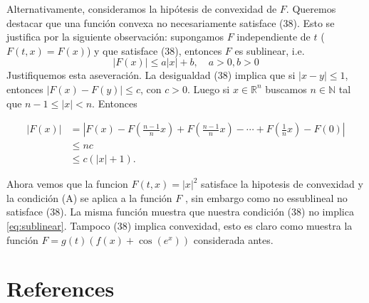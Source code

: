 \documentclass[twoside]{elsarticle}
\theoremstyle{remark}
\newcommand{\rr}{\mathbb{R}}
\newcommand{\nn}{\mathbb{N}}
\renewcommand{\leq}{\leqslant}
\begin{document}
Alternativamente, consideramos la hipótesis de convexidad de $F$. Queremos destacar que una función convexa no necesariamente satisface (38). Esto se justifica por la siguiente observación: supongamos $F$ independiente de $t$ ($F(t,x)=F(x)$) y que satisface (38), entonces $F$ es sublinear, i.e.
\[|F(x)|\leq a|x|+b,\quad a>0,b>0\]
Justifiquemos esta aseveración. La desigualdad (38) implica que si $|x-y|\leq 1$, entonces $|F(x)-F(y)|\leq c$, con $c>0$. Luego si $x\in\rr^n$ buscamos $n\in\nn$ tal que $n-1\leq |x|<n$. Entonces

\[
\begin{split}
|F(x)|&=\left|F(x)-F\left(\frac{n-1}{n}x\right)+ F\left(\frac{n-1}{n}x\right)-  \cdots
+F\left(\frac{1}{n}x\right)-F(0)\right|\\
&\leq nc\\
&\leq c(|x|+1).
\end{split}
\]

Ahora vemos que la funcion $F(t,x)=|x|^2$ satisface la hipotesis de convexidad y la condición (A) se aplica a la función $F$ , sin embargo como no  essublineal  no satisface (38). La misma función muestra que nuestra condición (38) no implica \eqref{eq:sublinear}.  Tampoco (38) implica convexidad, esto es claro como muestra la función  $F=g(t)(f(x)+\cos(e^x))$ considerada antes. 


\section*{References}

  
 
\end{document}
